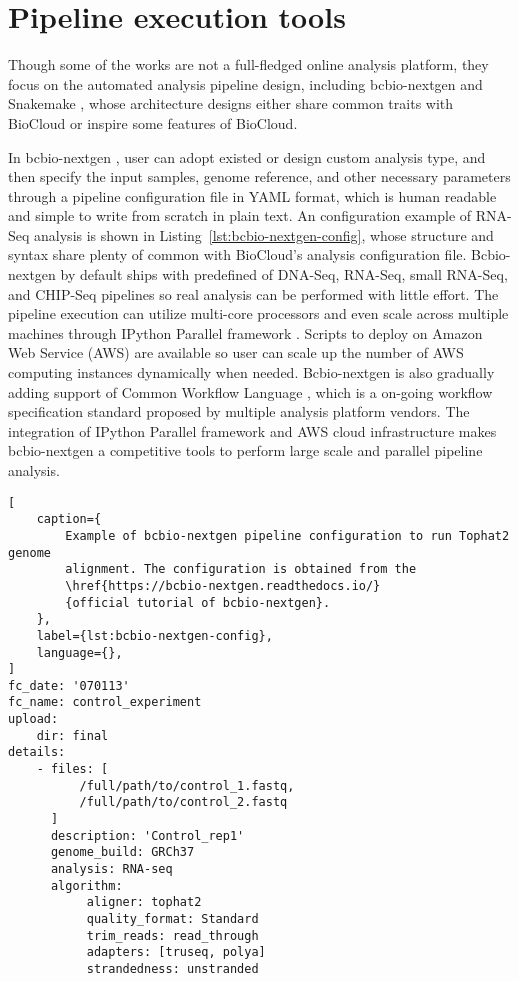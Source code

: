 \section{Pipeline execution tools}

Though some of the works are not a full-fledged online analysis platform, they
focus on the automated analysis pipeline design, including bcbio-nextgen
\cite{:bcbionextgen,guimera2012:bcbionextgen} and Snakemake
\cite{koster2012:snakemakea}, whose architecture designs either share common
traits with BioCloud or inspire some features of BioCloud.

In bcbio-nextgen \cite{:bcbionextgen,guimera2012:bcbionextgen}, user can adopt
existed or design custom analysis type, and then specify the input samples,
genome reference, and other necessary parameters through a pipeline
configuration file in YAML format, which is human readable and simple to write
from scratch in plain text. An configuration example of RNA-Seq analysis is
shown in Listing~\ref{lst:bcbio-nextgen-config}, whose structure and syntax
share plenty of common with BioCloud's analysis configuration file.
Bcbio-nextgen by default ships with predefined of DNA-Seq, RNA-Seq, small
RNA-Seq, and CHIP-Seq pipelines so real analysis can be performed with little
effort. The pipeline execution can utilize multi-core processors and even scale
across multiple machines through IPython Parallel framework
\cite{:ipython-parallel}. Scripts to deploy on Amazon Web Service (AWS) are
available so user can scale up the number of AWS computing instances
dynamically when needed. Bcbio-nextgen is also gradually adding support of
Common Workflow Language \cite{amstutz2016:common}, which is a on-going
workflow specification standard proposed by multiple analysis platform vendors.
The integration of IPython Parallel framework and AWS cloud infrastructure
makes bcbio-nextgen a competitive tools to perform large scale and parallel
pipeline analysis.

\begin{lstlisting}[
    caption={
        Example of bcbio-nextgen pipeline configuration to run Tophat2 genome
        alignment. The configuration is obtained from the
        \href{https://bcbio-nextgen.readthedocs.io/}
        {official tutorial of bcbio-nextgen}.
    },
    label={lst:bcbio-nextgen-config},
    language={},
]
fc_date: '070113'
fc_name: control_experiment
upload:
    dir: final
details:
    - files: [
          /full/path/to/control_1.fastq,
          /full/path/to/control_2.fastq
      ]
      description: 'Control_rep1'
      genome_build: GRCh37
      analysis: RNA-seq
      algorithm:
           aligner: tophat2
           quality_format: Standard
           trim_reads: read_through
           adapters: [truseq, polya]
           strandedness: unstranded
\end{lstlisting}

